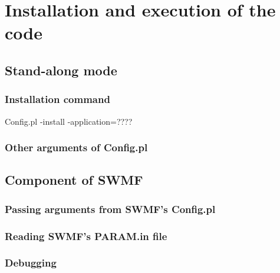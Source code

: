 
\chapter{Installation and execution of the code}

\section{Stand-along mode}

\subsection {Installation command}

Config.pl -install -application=????

\subsection{Other arguments of Config.pl}



\section {Component of SWMF}
\subsection {Passing arguments from SWMF's Config.pl}
\subsection {Reading SWMF's PARAM.in file}
\subsection {Debugging}




